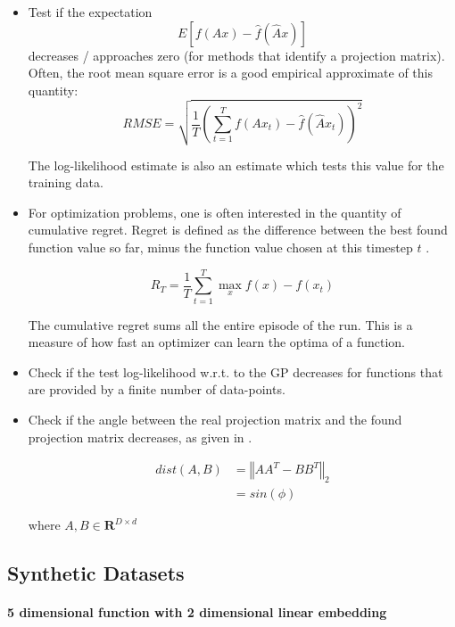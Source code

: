 \begin{itemize}
\item Test if the expectation $$ E[ f(A x) - \hat{f}(\hat{A} x) ] $$ decreases / approaches zero (for methods that identify a projection matrix).
Often, the root mean square error is a good empirical approximate of this quantity:
\begin{equation}
RMSE = \sqrt{ \frac{1}{T} (\sum_{t=1}^{T} f(A x_t) - \hat{f}(\hat{A} x_t))^2 }
\end{equation}

The log-likelihood estimate is also an estimate which tests this value for the training data.

\item For optimization problems, one is often interested in the quantity of cumulative regret.
Regret is defined as the difference between the best found function value so far, minus the function value chosen at this timestep $t$ \citep{RegretDef}.

\begin{equation}
R_T = \frac{1}{T} \sum_{t=1}^{T} \max_x f(x) - f(x_t)
\end{equation}

The cumulative regret sums all the entire episode of the run.
This is a measure of how fast an optimizer can learn the optima of a function.

\item Check if the test log-likelihood w.r.t. to the GP decreases for functions that are provided by a finite number of data-points.

\item Check if the angle between the real projection matrix and the found projection matrix decreases, as given in \citep{AngleMeasurement}. 

\begin{align}
dist(A, B) &= \left\Vert A A^T - B B^T\right\Vert_2 \\
& = sin( \phi )
\end{align}

where $ A, B \in \mathbf{R}^{D \times d}  $
\end{itemize}


\subsection{Synthetic Datasets} \label{syntheticFunction}
\paragraph{5 dimensional function with 2 dimensional linear embedding}

